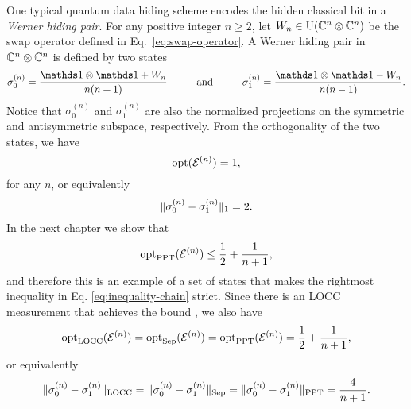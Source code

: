 \begin{example}
\label{example:werner-hiding-pairs}

One typical quantum data hiding scheme \cite{Terhal01a,DiVincenzo2002} encodes
the hidden classical bit in a \emph{Werner hiding pair}.
For any positive integer $n \geq 2$, let 
$W_{n} \in \mathrm{U}(\mathbb{C}^{n}\otimes\mathbb{C}^{n})$ be the swap operator 
defined in Eq.~\eqref{eq:swap-operator}. 
A Werner hiding pair in $\mathbb{C}^{n}\otimes\mathbb{C}^{n}$ is defined by two states 
\begin{equation}
  \label{eq:werner-states}
	\sigma_{0}^{(n)} = \frac{\I\otimes\I + W_{n}}{n(n+1)} 
		\hspace*{1cm}\mbox{and}\hspace*{1cm} 
	\sigma_{1}^{(n)} = \frac{\I\otimes\I - W_{n}}{n(n-1)}.
\end{equation}
Notice that $\sigma_{0}^{(n)}$ and $\sigma_{1}^{(n)}$ are also the normalized 
projections on the symmetric and antisymmetric subspace, respectively.
From the orthogonality of the two states, we have
\begin{equation}
	\operatorname{opt}(\mathcal{E}^{(n)}) = 1,
\end{equation}
for any $n$, or equivalently
\begin{equation}
  \lVert\sigma_{0}^{(n)} - \sigma_{1}^{(n)}\rVert_{1} = 2.
\end{equation}
In the next chapter we show that
\begin{equation}
  \operatorname{opt}_{\mathrm{PPT}}(\mathcal{E}^{(n)}) \leq \frac{1}{2} + \frac{1}{n+1},
\end{equation}
and therefore this is an example of a set of states that makes the rightmost
inequality in Eq. \eqref{eq:inequality-chain} strict.
Since there is an LOCC measurement that achieves the bound 
\cite{DiVincenzo2002}, we also have
\begin{equation}
  \operatorname{opt}_{\mathrm{LOCC}}(\mathcal{E}^{(n)}) = \operatorname{opt}_{\mathrm{Sep}}(\mathcal{E}^{(n)}) = \operatorname{opt}_{\mathrm{PPT}}(\mathcal{E}^{(n)}) = 
    \frac{1}{2} + \frac{1}{n+1},
\end{equation}
or equivalently
\begin{equation}
	\lVert\sigma_{0}^{(n)} - \sigma_{1}^{(n)}\rVert_{\mathrm{LOCC}} = 
    \lVert\sigma_{0}^{(n)} - \sigma_{1}^{(n)}\rVert_{\mathrm{Sep}} =
    \lVert\sigma_{0}^{(n)} - \sigma_{1}^{(n)}\rVert_{\mathrm{PPT}} = \frac{4}{n+1}.
\end{equation}
\end{example}



